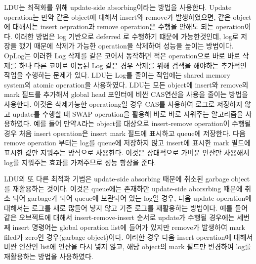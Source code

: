 \ifkor
LDU는 최적화를 위해 update-side absorbing이라는 방법을 사용한다. Update operation는 
만약 같은 object에 대해서 insert와 remove가 발생하였으면, 같은 object에 대해서는
insert oepration과 remove operation은 수행을 안해도 되는 operation이다. 
이러한 방법은 log 기반으로 deferred 로 수행하기 떄문에 가능한것인데, log로 저장을 했기 때문에 삭제가 가능한 operation을
삭제하여 성능을 높이는 방법이다.
OpLog는 이러한 Log 삭제를 같은 코어서 동작하면 적은 operation으로 바로 바로 삭제를 하나 다른 코어로 이동된 Log 같은 경우
삭제를 위해 검색을 해야하는 추가적인 작업을 수행하는 문제가 있다.
LDU는 Log를 줄이는 작업에는 shared memory system의 atomic operation을 사용하였다.
LDU는 모든 object에 insert와 remove의 mark 필드를 추가해서 global head 포인터에 비싼 CAS연산을 사용을
줄이는 방법을 사용한다.
이것은 삭제가능한 operationg일 경우 CAS를 사용하여 로그로 저장하지 않고 update를 수행할 때 SWAP operation을 활용해
바로 바로 지워주는 알고리즘을 사용하였다.
예를 들어 만약A라는 object를 대상으로 insert-remove operation이 수행될 경우 처음 insert operation은
insert mark 필드에 표시하고 queue에 저장한다.
다음 remove operation 부터는 log를 queue에 저장하지 않고 insert에 표시한 mark 필드에 표시한 값만 지워주는
방식으로 사용한다.
이것은 상대적으로 가벼운 연산만 사용해서 log를 지워주는 효과를 가져주므로 성능 향상을 준다.
\else
\fi







\ifkor
LDU의 또 다른 최적화 기법은 update-side absorbing 때문에 취소된 garbage object를 재활용하는 것이다.
이것은 queue에는 존재하만 update-side aborsrbing 때문에 취소 되어 garbage가 되어 queue에 보관되어 있는
log일 경우, 다음 update operation에 대해서는 로그를 새로 많들어 넣지 않고 기존 로그를 재활용하는 방법이다. 
예를 들어  같은 오브젝트에 대해서 insert-remove-insert 순서로 update가 수행될 경우에는 세번째 insert 명령어는
global operation list에 들어가 있지만 remove가 발생하여 mark filed가 zero인 경우(garbage
object)이다. 이러한 경우 다음 insert operation에 대해서 비싼 연산인 list에 연산을 다시 넣지 않고, 해당 object의
mark 필드만 변경하여 log를 재활용하는 방법을 사용하였다. 
\else
\fi



